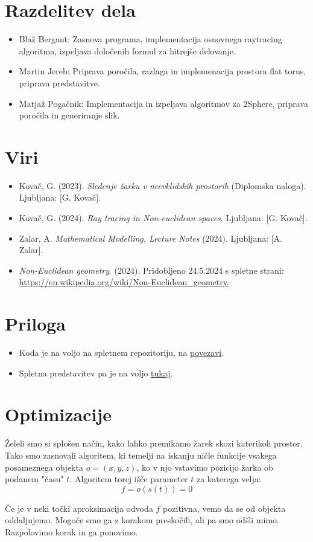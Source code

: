 \documentclass[titlepage]{article}
\begin{document}
\section{Razdelitev dela}
\begin{itemize}
  \item Blaž Bergant: Zasnova programa, implementacija osnovnega raytracing algoritma, izpeljava določenih formul za hitrejše delovanje.
  \item Martin Jereb: Priprava poročila, razlaga in implemenacija prostora flat torus, priprava predstavitve.
\item Matjaž Pogačnik: Implementacija in izpeljava algoritmov za 2Sphere, priprava poročila in generiranje slik.
\end{itemize}

\section{Viri}
\begin{itemize}
  \item Kovač, G. (2023). \textit{Sledenje žarku v neevklidskih prostorih} (Diplomska naloga). Ljubljana: [G. Kovač].
  \item Kovač, G. (2024). \textit{Ray tracing in Non-euclidean spaces}. Ljubljana: [G. Kovač].
  \item Zalar, A. \textit{Mathematical Modelling, Lecture Notes} (2024). Ljubljana: [A. Zalar].
  \item \textit{Non-Euclidean geometry}. (2024). Pridobljeno 24.5.2024 s spletne strani: \url{https://en.wikipedia.org/wiki/Non-Euclidean_geometry.}
\end{itemize}

\section{Priloga}
\begin{itemize}
  \item Koda je na voljo na spletnem repozitoriju, na \href{https://github.com/MAZI2/Ray-tracing-non-euclidean-spaces}{povezavi}.
  \item Spletna predstavitev pa je na voljo \href{https://docs.google.com/presentation/d/1NP8gkPzV8rE2ToBoUAP4b7w2yMkAWgCmlsRPMn_5Ahc/edit?usp=sharing}{tukaj}.
\end{itemize}
\section{Optimizacije}
Želeli smo si splošen način, kako lahko premikamo žarek skozi katerikoli prostor. Tako smo zasnovali algoritem, ki temelji na iskanju ničle funkcije vsakega posameznega objekta \( o = (x, y, z) \), ko v njo vstavimo pozicijo žarka ob podanem "času" \( t \). Algoritem torej išče parameter \( t \) za katerega velja:
\[ f = o(s(t)) = 0 \]

Če je v neki točki aproksimacija odvoda \( f \) pozitivna, vemo da se od objekta oddaljujemo. Mogoče smo ga z korakom preskočili, ali pa smo odšli mimo. Razpolovimo korak in ga ponovimo.
\end{document}
